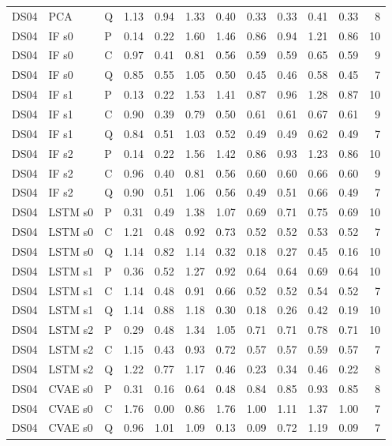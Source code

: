 \documentclass[10pt]{article}
\begin{document}
{\begin{longtable}{lllrrrrrrrrr}
DS04 & PCA & Q & 1.13 & 0.94 & 1.33 & 0.40 & 0.33 & 0.33 & 0.41 & 0.33 & 8 \\
DS04 & IF s0 & P & 0.14 & 0.22 & 1.60 & 1.46 & 0.86 & 0.94 & 1.21 & 0.86 & 10 \\
DS04 & IF s0 & C & 0.97 & 0.41 & 0.81 & 0.56 & 0.59 & 0.59 & 0.65 & 0.59 & 9 \\
DS04 & IF s0 & Q & 0.85 & 0.55 & 1.05 & 0.50 & 0.45 & 0.46 & 0.58 & 0.45 & 7 \\
DS04 & IF s1 & P & 0.13 & 0.22 & 1.53 & 1.41 & 0.87 & 0.96 & 1.28 & 0.87 & 10 \\
DS04 & IF s1 & C & 0.90 & 0.39 & 0.79 & 0.50 & 0.61 & 0.61 & 0.67 & 0.61 & 9 \\
DS04 & IF s1 & Q & 0.84 & 0.51 & 1.03 & 0.52 & 0.49 & 0.49 & 0.62 & 0.49 & 7 \\
DS04 & IF s2 & P & 0.14 & 0.22 & 1.56 & 1.42 & 0.86 & 0.93 & 1.23 & 0.86 & 10 \\
DS04 & IF s2 & C & 0.96 & 0.40 & 0.81 & 0.56 & 0.60 & 0.60 & 0.66 & 0.60 & 9 \\
DS04 & IF s2 & Q & 0.90 & 0.51 & 1.06 & 0.56 & 0.49 & 0.51 & 0.66 & 0.49 & 7 \\
DS04 & LSTM s0 & P & 0.31 & 0.49 & 1.38 & 1.07 & 0.69 & 0.71 & 0.75 & 0.69 & 10 \\
DS04 & LSTM s0 & C & 1.21 & 0.48 & 0.92 & 0.73 & 0.52 & 0.52 & 0.53 & 0.52 & 7 \\
DS04 & LSTM s0 & Q & 1.14 & 0.82 & 1.14 & 0.32 & 0.18 & 0.27 & 0.45 & 0.16 & 10 \\
DS04 & LSTM s1 & P & 0.36 & 0.52 & 1.27 & 0.92 & 0.64 & 0.64 & 0.69 & 0.64 & 10 \\
DS04 & LSTM s1 & C & 1.14 & 0.48 & 0.91 & 0.66 & 0.52 & 0.52 & 0.54 & 0.52 & 7 \\
DS04 & LSTM s1 & Q & 1.14 & 0.88 & 1.18 & 0.30 & 0.18 & 0.26 & 0.42 & 0.19 & 10 \\
DS04 & LSTM s2 & P & 0.29 & 0.48 & 1.34 & 1.05 & 0.71 & 0.71 & 0.78 & 0.71 & 10 \\
DS04 & LSTM s2 & C & 1.15 & 0.43 & 0.93 & 0.72 & 0.57 & 0.57 & 0.59 & 0.57 & 7 \\
DS04 & LSTM s2 & Q & 1.22 & 0.77 & 1.17 & 0.46 & 0.23 & 0.34 & 0.46 & 0.22 & 8 \\
DS04 & CVAE s0 & P & 0.31 & 0.16 & 0.64 & 0.48 & 0.84 & 0.85 & 0.93 & 0.85 & 8 \\
DS04 & CVAE s0 & C & 1.76 & 0.00 & 0.86 & 1.76 & 1.00 & 1.11 & 1.37 & 1.00 & 7 \\
DS04 & CVAE s0 & Q & 0.96 & 1.01 & 1.09 & 0.13 & 0.09 & 0.72 & 1.19 & 0.09 & 7 \\

\end{longtable}}
\end{document}
